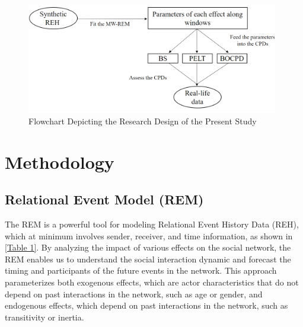 \documentclass[]{interact}
\theoremstyle{plain}%
\theoremstyle{definition}
\theoremstyle{remark}
\begin{document}
{    \begin{figure}[H]
    	\captionsetup{justification=raggedright}
    	\renewcommand{\figurename}{Figure}
    	\centering
    	\includegraphics[width=11cm]{Flow_whole}
    	\caption{\fontsize{8}{10}\selectfont Flowchart Depicting the Research Design of the Present Study}
    	\label{Figure 1}
    \end{figure}
	
	\section{\fontsize{14}{15}\selectfont Methodology} \label{sec:method}
	
	\subsection{Relational Event Model (REM)} \label{sec:REM}
	
	\hspace{0.28cm} The REM is a powerful tool for modeling Relational Event History Data (REH), which at minimum involves sender, receiver, and time information, as shown in \autoref{Table 1}. By analyzing the impact of various effects on the social network, the REM enables us to understand the social interaction dynamic and forecast the timing and participants of the future events in the network. This approach parameterizes both exogenous effects, which are actor characteristics that do not depend on past interactions in the network, such as age or gender, and endogenous effects, which depend on past interactions in the network, such as transitivity or inertia. \\
	
}
\end{document}

